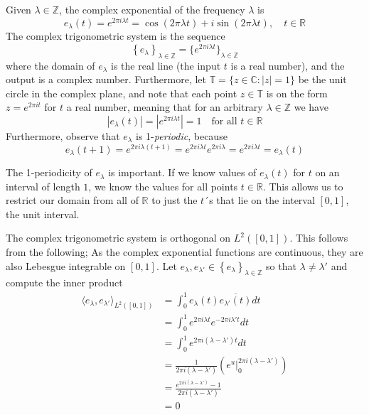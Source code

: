 \documentclass[../thesis.tex]{subfiles}
\begin{document}
Given $\lambda \in \mathbb{Z}$, the complex exponential of the frequency $\lambda$ is 
\begin{equation}
    e_{\lambda}(t) = e^{2 \pi i \lambda t} = \cos{(2 \pi \lambda t)} + i \sin{(2 \pi \lambda t)}, \quad t\in \mathbb{R}    
\end{equation}
The complex trigonometric system is the sequence
\begin{equation}
    \left\{ e_{\lambda} \right\}_{\lambda\in \mathbb{Z}} = \{ e^{2 \pi i \lambda t} \}_{\lambda \in \mathbb{Z}}    
\end{equation}
where the domain of $e_\lambda$ is the real line (the input $t$ is a real number), and the output is a complex number. Furthermore, let $\mathbb{T}=\{z\in \mathbb{C} : |z|=1\}$ be the unit circle in the complex plane, and note that each point $z\in\mathbb{T}$ is on the form $z=e^{2 \pi i t}$ for $t$ a real number, meaning that for an arbitrary $\lambda \in \mathbb{Z}$ we have
\begin{equation}
    \left|e_{\lambda}(t) \right|= |e^{2 \pi i \lambda t} | = 1 \quad \text{for all } t\in \mathbb{R} 
\end{equation}
Furthermore, observe that $e_\lambda$ is 1-\emph{periodic}, because
\begin{equation}
    e_\lambda(t+1) = e^{2 \pi i \lambda (t+1)} = e^{2 \pi i \lambda t} e^{2 \pi i \lambda} = e^{2 \pi i \lambda t} = e_\lambda(t)
\end{equation}

The 1-periodicity of $e_\lambda$ is important. If we know values of $e_\lambda(t)$ for $t$ on an interval of length $1$, we know the values for all points $t\in \mathbb{R}$. This allows us to restrict our domain from all of $\mathbb{R}$ to just the $t$´s that lie on the interval $[0,1]$, the unit interval.

The complex trigonometric system is orthogonal on $L^2([0,1])$. This follows from the following; As the complex exponential functions are continuous, they are also Lebesgue integrable on $[0,1]$. Let $e_{\lambda}, e_{\lambda'} \in \left\{ e_{\lambda} \right\}_{\lambda\in \mathbb{Z}}$ so that $\lambda \neq \lambda'$ and compute the inner product
\begin{align*} 
\langle e_{\lambda},e_{\lambda'} \rangle_{L^2([0,1])} 
&= \int_0^1 e_{\lambda}(t)\overline{e_{\lambda'}(t)} dt\\ &= \int_0^1 e^{2 \pi i {\lambda}t} e^{-2 \pi i {\lambda'}t} dt\\
&= \int_0^1 e^{2 \pi i (\lambda-\lambda')t} dt\\
&=\frac{1}{2 \pi i (\lambda-\lambda')}\left( e^u  \big| _0^{2 \pi i (\lambda-\lambda')}\right)\\
&=\frac{e^{2 \pi i (\lambda-\lambda')}-1}{2 \pi i (\lambda-\lambda')}\\
&= 0
\end{align*}
\end{document}
